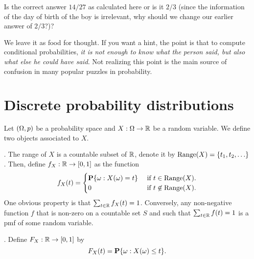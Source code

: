 \documentclass[preprint,  11pt]{amsart}
\begin{document}
Is the correct answer $14/27$ as calculated here or is it $2/3$ (since the  information of the day of birth of the boy is irrelevant, why should we change our earlier answer of $2/3$?)?

We leave it as food for thought. If you want a hint, the point is that to compute conditional probabilities, {\em it is not enough to know what the person said, but also what else he could have said}. Not realizing  this point is the main source of confusion in many  popular puzzles in probability.

\section{Discrete probability distributions}
Let $(\Omega,p)$ be a probability space and $X:\Omega\rightarrow \mathbb{R}$ be a random variable. We define two objects associated to $X$.

. The range of $X$ is a countable subset of $\mathbb{R}$, denote it by $\mbox{Range}(X)=\{t_{1},t_{2},\ldots\}$. Then, define $f_{X}:\mathbb{R}\rightarrow [0,1]$ as the function
$$
f_{X}(t)=\begin{cases}
\mathbf{P}\{\omega {\; : \;} X(\omega)=t\} & \mbox{ if }t\in \mbox{Range}(X). \\
0 & \mbox{ if }t\not\in \mbox{Range}(X).
\end{cases}
$$
One obvious property is that $\sum_{t\in \mathbb{R}}f_{X}(t)=1$. Conversely, any non-negative function $f$ that is non-zero on a countable set $S$ and such that $\sum_{t\in \mathbb{R}} f(t)=1$ is a pmf of some random variable.

. Define $F_{X}:\mathbb{R}\rightarrow [0,1]$ by
$$F_{X}(t)=\mathbf{P}\{\omega{\; : \;} X(\omega)\le t\}.$$
\end{document}
